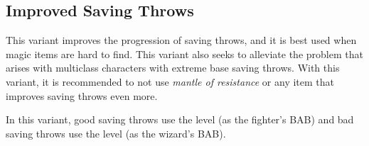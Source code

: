 \subsection{Improved Saving Throws}
This variant improves the progression of saving throws, and it is best used when magic items are hard to find. This variant also seeks to alleviate the problem that arises with multiclass characters with extreme base saving throws. With this variant, it is recommended to not use \emph{mantle of resistance} or any item that improves saving throws even more.

In this variant, good saving throws use the level (as the fighter's BAB) and bad saving throws use \onehalf the level (as the wizard's BAB).


